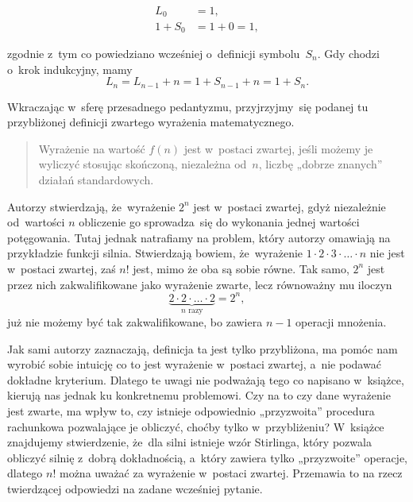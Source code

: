\documentclass[a4paper,11pt]{article}
\numberwithin{equation}{section}
\begin{document}
\begin{subequations}

  \begin{align}
    \label{eq:1114}
    L_{ 0 } &= 1, \\
    1 + S_{ 0 } &= 1 + 0 = 1,
  \end{align}

\end{subequations}

\noindent
zgodnie z~tym co powiedziano wcześniej o~definicji symbolu~$S_{ n }$. Gdy
chodzi o~krok indukcyjny, mamy
\begin{equation}
  \label{eq:1115}
  L_{ n } = L_{ n - 1 } + n = 1 + S_{ n - 1 } + n = 1 + S_{ n }.
\end{equation}

\VerSpaceFour





\noindent
Wkraczając w~sferę przesadnego pedantyzmu, przyjrzyjmy~się podanej tu
przybliżonej definicji zwartego wyrażenia matematycznego.




\begin{quote}

  Wyrażenie na wartość $f( n )$ jest w~postaci zwartej, jeśli możemy je
  wyliczyć stosując skończoną, niezależna od~$n$, liczbę „dobrze znanych”
  działań standardowych.

\end{quote}





Autorzy stwierdzają, że~wyrażenie $2^{ n }$ jest w~postaci zwartej, gdyż
niezależnie od~wartości $n$ obliczenie go sprowadza~się do wykonania jednej
wartości potęgowania. Tutaj jednak natrafiamy na problem, który autorzy
omawiają na przykładzie funkcji silnia. Stwierdzają bowiem, że~wyrażenie
$1 \cdot 2 \cdot 3 \cdot \ldots \cdot n$ nie jest w~postaci zwartej, zaś $n!$ jest, mimo że
oba są sobie równe. Tak samo, $2^{ n }$ jest przez nich zakwalifikowane jako wyrażenie zwarte, lecz równoważny mu iloczyn
\begin{equation}
  \label{eq:aa}
  \underbrace{2 \cdot 2 \cdot \ldots \cdot 2}_{ n \text{ razy} } = 2^{ n },
\end{equation}
już nie możemy być tak zakwalifikowane, bo zawiera $n - 1$ operacji mnożenia.

Jak sami autorzy zaznaczają, definicja ta jest tylko przybliżona, ma pomóc
nam wyrobić sobie intuicję co to jest wyrażenie w~postaci zwartej, a~nie
podawać dokładne kryterium. Dlatego te uwagi nie podważają tego co napisano
w~książce, kierują nas jednak ku konkretnemu problemowi. Czy na to czy dane
wyrażenie jest zwarte, ma wpływ to, czy istnieje odpowiednio „przyzwoita”
procedura rachunkowa pozwalające je obliczyć, choćby tylko w~przybliżeniu?
W~książce znajdujemy stwierdzenie, że~dla silni istnieje wzór Stirlinga,
który pozwala obliczyć silnię z~dobrą dokładnością, a~który zawiera tylko
„przyzwoite” operacje, dlatego $n!$ można uważać za wyrażenie w~postaci
zwartej. Przemawia to na rzecz twierdzącej odpowiedzi na zadane wcześniej
pytanie.
\end{document}
